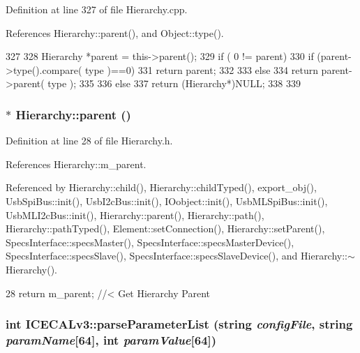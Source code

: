 Definition at line 327 of file Hierarchy.cpp.

References Hierarchy::parent(), and Object::type().


\begin{DoxyCode}
327                                             {
328   Hierarchy *parent = this->parent();
329   if ( 0 != parent){
330     if (parent->type().compare( type )==0) {
331       return parent;
332     }
333     else
334       return parent->parent( type );
335   }
336   else {
337     return (Hierarchy*)NULL;
338   }
339 }
\end{DoxyCode}
\hypertarget{classHierarchy_a1c7bec8257e717f9c1465e06ebf845fc}{
\subsubsection[{parent}]{$\ast$ Hierarchy::parent ()}}
\label{classHierarchy_a1c7bec8257e717f9c1465e06ebf845fc}


Definition at line 28 of file Hierarchy.h.

References Hierarchy::m\_\-parent.

Referenced by Hierarchy::child(), Hierarchy::childTyped(), export\_\-obj(), UsbSpiBus::init(), UsbI2cBus::init(), IOobject::init(), UsbMLSpiBus::init(), UsbMLI2cBus::init(), Hierarchy::parent(), Hierarchy::path(), Hierarchy::pathTyped(), Element::setConnection(), Hierarchy::setParent(), SpecsInterface::specsMaster(), SpecsInterface::specsMasterDevice(), SpecsInterface::specsSlave(), SpecsInterface::specsSlaveDevice(), and Hierarchy::$\sim$Hierarchy().


\begin{DoxyCode}
28 { return m_parent; }  //< Get Hierarchy Parent
\end{DoxyCode}
\hypertarget{classICECALv3_a313e8166af1ce26b4026f883ad900fb9}{
\subsubsection[{parseParameterList}]{\setlength{\rightskip}{0pt plus 5cm}int ICECALv3::parseParameterList (string {\em configFile}, \/  string {\em paramName}\mbox{[}64\mbox{]}, \/  int {\em paramValue}\mbox{[}64\mbox{]})}}
\label{classICECALv3_a313e8166af1ce26b4026f883ad900fb9}


